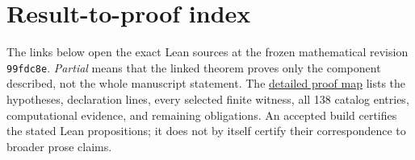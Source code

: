 \section*{Result-to-proof index}
\label{j:proof-index}

The links below open the exact Lean sources at the frozen mathematical
revision \texttt{99fdc8e}. \emph{Partial} means that the linked theorem proves
only the component described, not the whole manuscript statement.
The \href{https://github.com/alejandrozu/kobon-proof/blob/main/paper/journal/proof_map.md}{detailed proof map}
lists the hypotheses, declaration lines, every selected finite witness,
all 138 catalog entries, computational evidence, and remaining obligations.
An accepted build certifies the stated Lean propositions; it does not
by itself certify their correspondence to broader prose claims.

